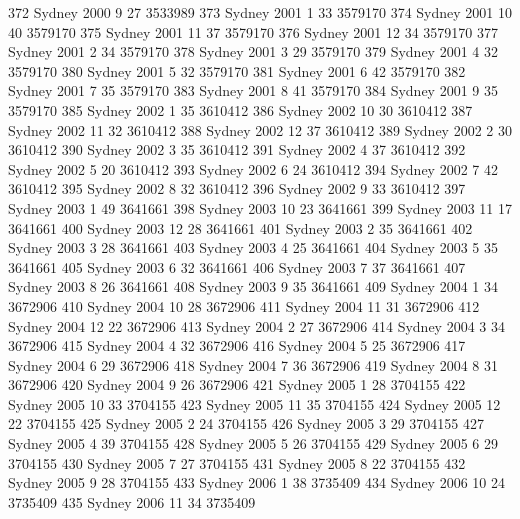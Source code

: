 \documentclass[a4paper]{article}                %
\begin{document}
\begin{Schunk}
\begin{Soutput}
372   Sydney  2000     9      27 3533989
373   Sydney  2001     1      33 3579170
374   Sydney  2001    10      40 3579170
375   Sydney  2001    11      37 3579170
376   Sydney  2001    12      34 3579170
377   Sydney  2001     2      34 3579170
378   Sydney  2001     3      29 3579170
379   Sydney  2001     4      32 3579170
380   Sydney  2001     5      32 3579170
381   Sydney  2001     6      42 3579170
382   Sydney  2001     7      35 3579170
383   Sydney  2001     8      41 3579170
384   Sydney  2001     9      35 3579170
385   Sydney  2002     1      35 3610412
386   Sydney  2002    10      30 3610412
387   Sydney  2002    11      32 3610412
388   Sydney  2002    12      37 3610412
389   Sydney  2002     2      30 3610412
390   Sydney  2002     3      35 3610412
391   Sydney  2002     4      37 3610412
392   Sydney  2002     5      20 3610412
393   Sydney  2002     6      24 3610412
394   Sydney  2002     7      42 3610412
395   Sydney  2002     8      32 3610412
396   Sydney  2002     9      33 3610412
397   Sydney  2003     1      49 3641661
398   Sydney  2003    10      23 3641661
399   Sydney  2003    11      17 3641661
400   Sydney  2003    12      28 3641661
401   Sydney  2003     2      35 3641661
402   Sydney  2003     3      28 3641661
403   Sydney  2003     4      25 3641661
404   Sydney  2003     5      35 3641661
405   Sydney  2003     6      32 3641661
406   Sydney  2003     7      37 3641661
407   Sydney  2003     8      26 3641661
408   Sydney  2003     9      35 3641661
409   Sydney  2004     1      34 3672906
410   Sydney  2004    10      28 3672906
411   Sydney  2004    11      31 3672906
412   Sydney  2004    12      22 3672906
413   Sydney  2004     2      27 3672906
414   Sydney  2004     3      34 3672906
415   Sydney  2004     4      32 3672906
416   Sydney  2004     5      25 3672906
417   Sydney  2004     6      29 3672906
418   Sydney  2004     7      36 3672906
419   Sydney  2004     8      31 3672906
420   Sydney  2004     9      26 3672906
421   Sydney  2005     1      28 3704155
422   Sydney  2005    10      33 3704155
423   Sydney  2005    11      35 3704155
424   Sydney  2005    12      22 3704155
425   Sydney  2005     2      24 3704155
426   Sydney  2005     3      29 3704155
427   Sydney  2005     4      39 3704155
428   Sydney  2005     5      26 3704155
429   Sydney  2005     6      29 3704155
430   Sydney  2005     7      27 3704155
431   Sydney  2005     8      22 3704155
432   Sydney  2005     9      28 3704155
433   Sydney  2006     1      38 3735409
434   Sydney  2006    10      24 3735409
435   Sydney  2006    11      34 3735409

\end{Soutput}
\end{Schunk}
\end{document}
